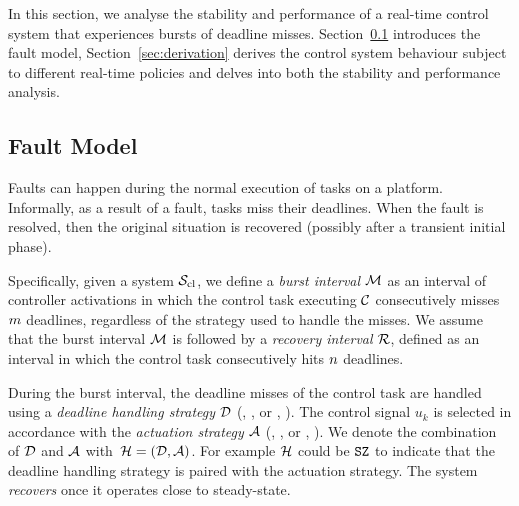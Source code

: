 In this section, we analyse the stability and performance of a real-time control system that experiences bursts of deadline misses. 
Section~\ref{sec:fault} introduces the fault model, Section~\ref{sec:derivation} derives the control system behaviour subject to different real-time policies and delves into both the stability and performance analysis.

\subsection{Fault Model}%
\label{sec:fault}

Faults can happen during the normal execution of tasks on a platform.
Informally, as a result of a fault, tasks miss their deadlines.
When the fault is resolved, then the original situation is recovered (possibly after a transient initial phase).

Specifically, given a system $\mathcal{S}_{\text{cl}}$, we define a \emph{burst interval} $\mathcal{M}$ as an interval of controller activations in which the control task executing $\mathcal{C}$ consecutively misses $m$ deadlines, regardless of the strategy used to handle the misses.
We assume that the burst interval $\mathcal{M}$ is followed by a \emph{recovery interval} $\mathcal{R}$, defined as an interval in which the control task consecutively hits $n$ deadlines.

During the burst interval, the deadline misses of the control task are handled using a \emph{deadline handling strategy} $\mathcal{D}$ (\tK{}, \Kill, or \tS{}, \Skip).
The control signal $u_k$ is selected in accordance with the \emph{actuation strategy} $\mathcal{A}$ (\tZ{}, \Zero, or \tH{}, \Hold).
We denote the combination of $\mathcal{D}$ and $\mathcal{A}$ with~$\mathcal{H} = \left(\mathcal{D},\mathcal{A}\right)$.
For example $\mathcal{H}$ could be $\texttt{S}\texttt{Z}$ to indicate that the \tS{} deadline handling strategy is paired with the \tZ{} actuation strategy.
The system \emph{recovers} once it operates close to steady-state.

